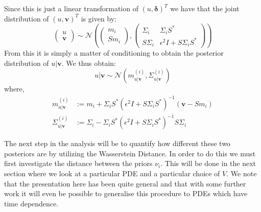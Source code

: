 Since this is just a linear transformation of $(u,\boldsymbol{\delta})^{T}$ we have that the joint distribution of $(u,\mathbf{v})^{T}$ is given by:
\begin{equation}
  \label{jointDist}
  \begin{pmatrix}
    u \\
    \mathbf{v}
  \end{pmatrix}\sim\mathcal{N}\left(
                              \begin{pmatrix}
                                m_{i} \\
                                Sm_{i}
                              \end{pmatrix},
                              \begin{pmatrix}
                                \Sigma_{i} & \Sigma_{i} S^{*} \\
                                S\Sigma_{i} & \epsilon^{2}I+S\Sigma_{i} S^{*}
                              \end{pmatrix}
                              \right)
\end{equation}
From this it is simply a matter of conditioning to obtain the posterior distribution of $u|\mathbf{v}$. We thus obtain:
\begin{equation}
  \label{posterior}
  u|\mathbf{v}\sim\mathcal{N}(m^{(i)}_{u|\mathbf{v}},\Sigma^{(i)}_{u|\mathbf{v}})
\end{equation}
where,
\begin{align}
  \label{posterior_mean}
  m^{(i)}_{u|\mathbf{v}}&:=m_i+\Sigma_{i}S^{*}(\epsilon^{2}I+S\Sigma_{i}S^{*})^{-1}(\mathbf{v}-Sm_{i}) \\
  \label{posterior_covariance}
  \Sigma^{(i)}_{u|\mathbf{v}}&:=\Sigma_{i}-\Sigma_{i}S^{*}(\epsilon^{2}I+S\Sigma_{i}S^{*})^{-1}S\Sigma_{i}
\end{align}

The next step in the analysis will be to quantify how different these two posteriors are by utilizing the Wasserstein Distance. In order to do this we must first investigate the distance between the priors $\nu_{i}$. This will be done in the next section where we look at a particular PDE and a particular choice of $V$. We note that the presentation here has been quite general and that with some further work it will even be possible to generalise this procedure to PDEs which have time dependence.
